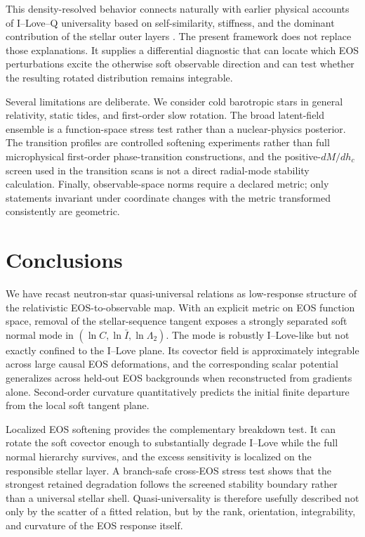 This density-resolved behavior connects naturally with earlier physical accounts of I--Love--Q universality based on self-similarity, stiffness, and the dominant contribution of the stellar outer layers \cite{yagi2014why,sham2015unveiling}. The present framework does not replace those explanations. It supplies a differential diagnostic that can locate which EOS perturbations excite the otherwise soft observable direction and can test whether the resulting rotated distribution remains integrable.

Several limitations are deliberate. We consider cold barotropic stars in general relativity, static tides, and first-order slow rotation. The broad latent-field ensemble is a function-space stress test rather than a nuclear-physics posterior. The transition profiles are controlled softening experiments rather than full microphysical first-order phase-transition constructions, and the positive-\(dM/dh_c\) screen used in the transition scans is not a direct radial-mode stability calculation. Finally, observable-space norms require a declared metric; only statements invariant under coordinate changes with the metric transformed consistently are geometric.

\section{Conclusions}

We have recast neutron-star quasi-universal relations as low-response structure of the relativistic EOS-to-observable map. With an explicit metric on EOS function space, removal of the stellar-sequence tangent exposes a strongly separated soft normal mode in \((\ln C,\ln\bar I,\ln\Lambda_2)\). The mode is robustly I--Love-like but not exactly confined to the I--Love plane. Its covector field is approximately integrable across large causal EOS deformations, and the corresponding scalar potential generalizes across held-out EOS backgrounds when reconstructed from gradients alone. Second-order curvature quantitatively predicts the initial finite departure from the local soft tangent plane.

Localized EOS softening provides the complementary breakdown test. It can rotate the soft covector enough to substantially degrade I--Love while the full normal hierarchy survives, and the excess sensitivity is localized on the responsible stellar layer. A branch-safe cross-EOS stress test shows that the strongest retained degradation follows the screened stability boundary rather than a universal stellar shell. Quasi-universality is therefore usefully described not only by the scatter of a fitted relation, but by the rank, orientation, integrability, and curvature of the EOS response itself.
